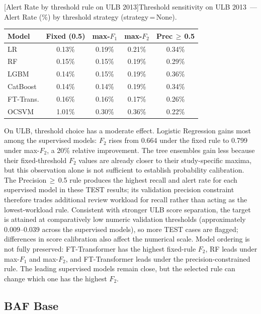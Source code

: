 \noindent\begin{minipage}{\linewidth}\centering
{}[Alert Rate by threshold rule on ULB 2013]{Threshold sensitivity on ULB 2013~--- Alert Rate (\%) by threshold strategy (strategy\,=\,None).}
\label{tab:threshold_ulb_alert}
\begin{tabular}{l c c c c}
\toprule
Model & Fixed (0.5) & max-$F_1$ & max-$F_2$ & Prec\,$\geq$\,0.5 \\
\midrule
LR         & 0.13\% & 0.19\% & 0.21\% & 0.34\% \\
RF         & 0.15\% & 0.15\% & 0.19\% & 0.29\% \\
LGBM       & 0.14\% & 0.15\% & 0.19\% & 0.36\% \\
CatBoost   & 0.14\% & 0.14\% & 0.19\% & 0.34\% \\
FT-Trans.  & 0.16\% & 0.16\% & 0.17\% & 0.26\% \\
OCSVM      & 1.01\% & 0.30\% & 0.36\% & 0.22\% \\
\bottomrule
\end{tabular}
\end{minipage}

On ULB, threshold choice has a moderate effect. Logistic Regression gains most among the supervised models: $F_2$ rises from 0.664 under the fixed rule to 0.799 under max-$F_2$, a 20\% relative improvement. The tree ensembles gain less because their fixed-threshold $F_2$ values are already closer to their study-specific maxima, but this observation alone is not sufficient to establish probability calibration. The Precision\,$\geq$\,0.5 rule produces the highest recall and alert rate for each supervised model in these TEST results; its validation precision constraint therefore trades additional review workload for recall rather than acting as the lowest-workload rule. Consistent with stronger ULB score separation, the target is attained at comparatively low numeric validation thresholds (approximately 0.009--0.039 across the supervised models), so more TEST cases are flagged; differences in score calibration also affect the numerical scale. Model ordering is not fully preserved: FT-Transformer has the highest fixed-rule $F_2$, RF leads under max-$F_1$ and max-$F_2$, and FT-Transformer leads under the precision-constrained rule. The leading supervised models remain close, but the selected rule can change which one has the highest $F_2$.


\subsection{BAF Base}

